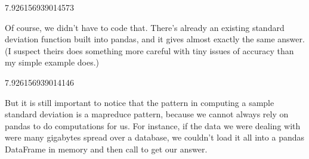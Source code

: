 \documentclass[letterpaper,10pt,english]{sphinxmanual}
\begin{document}
\begin{sphinxVerbatim}[commandchars=\\\{\}]
   

  \PYG{p}{[}\PYG{p}{]}
  

    
           
    
             

    
\end{sphinxVerbatim}

\begin{sphinxVerbatim}[commandchars=\\\{\}]
7.926156939014573
\end{sphinxVerbatim}

Of course, we didn’t have to code that.  There’s already an existing standard deviation function built into pandas, and it gives almost exactly the same answer.  (I suspect theirs does something more careful with tiny issues of accuracy than my simple example does.)

\begin{sphinxVerbatim}[commandchars=\\\{\}]
\end{sphinxVerbatim}

\begin{sphinxVerbatim}[commandchars=\\\{\}]
7.926156939014146
\end{sphinxVerbatim}

But it is still important to notice that the pattern in computing a sample standard deviation is a map\sphinxhyphen{}reduce pattern, because we cannot always rely on pandas to do computations for us.  For instance, if the data we were dealing with were many gigabytes spread over a database, we couldn’t load it all into a pandas DataFrame in memory and then call  to get our answer.
\end{document}
